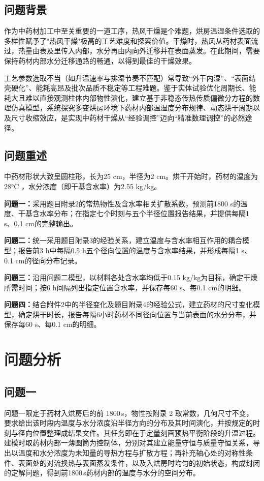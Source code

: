 \subsection{问题背景}
作为中药材加工中至关重要的一道工序，热风干燥是个难题，烘房温湿条件选取的多样性赋予了"热风干燥"极高的工艺难度和探索价值。干燥时，热风从药材表面流过，热量由表及里传入内部，水分再由内向外迁移并在表面蒸发。在此期间，需要保持药材内部水分迁移通路的畅通，以得到最佳的干燥效果。

工艺参数选取不当（如升温速率与排湿节奏不匹配）常导致“外干内湿”、“表面结壳硬化”、能耗高昂及批次品质不稳定等工程难题。鉴于实体试验优化周期长、能耗大且难以直接观测柱体内部物性演化，建立基于非稳态传热传质偏微分方程的数理仿真模型，系统探究多变烘房环境下药材内部温湿度分布规律、动态烘干周期以及尺寸收缩效应，是实现中药材干燥从“经验调控”迈向“精准数理调控”的必然途径。

\subsection{问题重述}
中药材形状大致呈圆柱形，长为25 cm，半径为2 cm。烘干开始时，药材的温度为28°C ，水分浓度（即干基含水率）为2.55 kg/kg。

\textbf{问题一：}采用题目附录2的常热物性及含水率相关扩散系数，预测前1800 s的温度、干基含水率分布；在指定七个时刻与五个半径位置报告结果，并提供每隔1 s、0.1 cm的完整输出。

\textbf{问题二：}统一采用题目附录3的经验关系，建立温度与含水率相互作用的耦合模型；报告前3 h中每隔0.5 h五个径向位置的温度与含水率结果，并形成每隔1 s、0.1 cm的径向分布记录。

\textbf{问题三：}沿用问题二模型，以材料各处含水率均低于0.15 kg/kg为目标，确定干燥所需时间；按6 h间隔列出指定位置含水率，并保存每60 s、每0.1 cm的明细。

\textbf{问题四：}结合附件2中的半径变化及题目附录4的经验公式，建立药材的尺寸变化模型，确定烘干时长，报告每隔6小时药材不同径向位置与当前表面的水分分布，并保存每60 s、每0.1 cm的明细。

\section{问题分析}
\subsection*{问题一}
问题一限定于药材入烘房后的前 1800\,s，物性按附录 2 取常数，几何尺寸不变，要求给出该时段内温度与水分浓度沿半径方向的分布及其时间演化，并按规定的时刻与径向位置整理成结果文件。其任务即在于定量刻画预热平衡阶段的升温过程。建模时取药材内部一薄圆筒为控制体，分别对其建立能量守恒与质量守恒关系，导出以温度和水分浓度为未知量的导热方程与扩散方程；再补充轴心处的对称性条件、表面处的对流换热与表面蒸发条件，以及入烘房时均匀的初始状态，构成封闭的定解问题，得到前1800\,s药材内部的温度与水分的空间分布。

